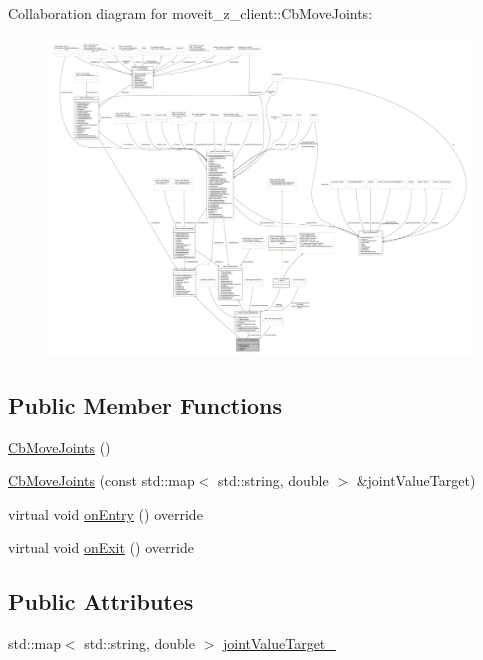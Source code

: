 Collaboration diagram for moveit\+\_\+z\+\_\+client\+:\+:Cb\+Move\+Joints\+:
\nopagebreak
\begin{figure}[H]
\begin{center}
\leavevmode
\includegraphics[width=350pt]{classmoveit__z__client_1_1CbMoveJoints__coll__graph}
\end{center}
\end{figure}
\subsection*{Public Member Functions}
\begin{DoxyCompactItemize}
\item 
\hyperlink{classmoveit__z__client_1_1CbMoveJoints_a8d9f24fd96baa202c546654f3e92f51c}{Cb\+Move\+Joints} ()
\item 
\hyperlink{classmoveit__z__client_1_1CbMoveJoints_ae0f43ac05e5263161541eb6bc15fa457}{Cb\+Move\+Joints} (const std\+::map$<$ std\+::string, double $>$ \&joint\+Value\+Target)
\item 
virtual void \hyperlink{classmoveit__z__client_1_1CbMoveJoints_a512e97e94ab05ee12837433e5d921095}{on\+Entry} () override
\item 
virtual void \hyperlink{classmoveit__z__client_1_1CbMoveJoints_a104abb9c8f8ebb04a6e5c8e84b473add}{on\+Exit} () override
\end{DoxyCompactItemize}
\subsection*{Public Attributes}
\begin{DoxyCompactItemize}
\item 
std\+::map$<$ std\+::string, double $>$ \hyperlink{classmoveit__z__client_1_1CbMoveJoints_a0f52577dd2fccf25f36c4c93e733c0f4}{joint\+Value\+Target\+\_\+}
\end{DoxyCompactItemize}
